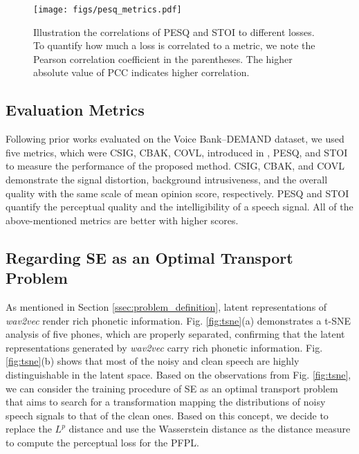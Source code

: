 \documentclass[a4paper]{article}
\begin{document}
\begin{figure*}[t]
    \centering
    \texttt{[image: figs/pesq\_metrics.pdf]}
\caption{Illustration the correlations of PESQ and STOI to different losses. To quantify how much a loss is correlated to a metric, we note the Pearson correlation coefficient in the parentheses. The higher absolute value of PCC indicates higher correlation.}
\label{fig:relation}
\end{figure*}

\subsection{Evaluation Metrics}
\label{ssec:evaluation_metrics}
Following prior works evaluated on the Voice Bank--DEMAND dataset, we used five metrics, which were CSIG, CBAK, COVL, introduced in \cite{metric}, PESQ, and STOI to measure the performance of the proposed method. CSIG, CBAK, and COVL demonstrate the signal distortion, background intrusiveness, and the overall quality with the same scale of mean opinion score, respectively. PESQ and STOI quantify the perceptual quality and the intelligibility of a speech signal. All of the above-mentioned metrics are better with higher scores.

\subsection{Regarding SE as an Optimal Transport Problem}
\label{ssec:visulaization_on_wav2vec_features}
As mentioned in Section \ref{ssec:problem_definition}, latent representations of \textit{wav2vec} render rich phonetic information. Fig. \ref{fig:tsne}(a) demonstrates a t-SNE analysis of five phones, which are properly separated, confirming that the latent representations generated by \textit{wav2vec} carry rich phonetic information. Fig. \ref{fig:tsne}(b) shows that most of the noisy and clean speech are highly distinguishable in the latent space. Based on the observations from Fig. \ref{fig:tsne}, we can consider the training procedure of SE as an optimal transport problem that aims to search for a transformation mapping the distributions of noisy speech signals to that of the clean ones. Based on this concept, we decide to replace the $L^p$ distance and use the Wasserstein distance as the distance measure to compute the perceptual loss for the PFPL.
\end{document}
